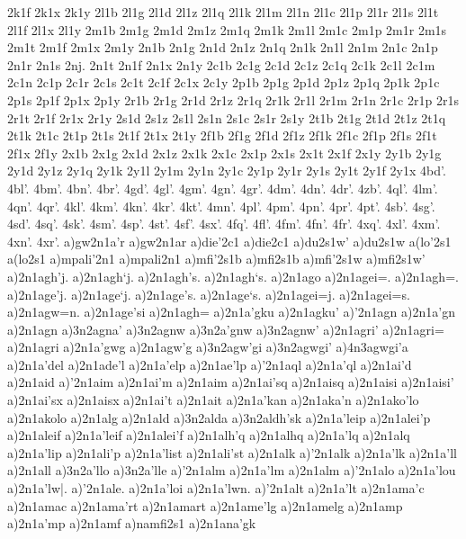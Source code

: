 {2k1f
2k1x
2k1y
%
2l1b
2l1g
2l1d
2l1z
2l1q
2l1k
2l1m
2l1n
2l1c
2l1p
2l1r
2l1s
2l1t
2l1f
2l1x
2l1y
%
2m1b
2m1g
2m1d
2m1z
2m1q
2m1k
2m1l
2m1c
2m1p
2m1r
2m1s
2m1t
2m1f
2m1x
2m1y
%
2n1b
2n1g
2n1d
2n1z
2n1q
2n1k
2n1l
2n1m
2n1c
2n1p
2n1r
2n1s
2nj.
2n1t
2n1f
2n1x
2n1y
%
2c1b
2c1g
2c1d
2c1z
2c1q
2c1k
2c1l
2c1m
2c1n
2c1p
2c1r
2c1s
2c1t
2c1f
2c1x
2c1y
%
2p1b
2p1g
2p1d
2p1z
2p1q
2p1k
2p1c
2p1s
2p1f
2p1x
2p1y
%
2r1b
2r1g
2r1d
2r1z
2r1q
2r1k
2r1l
2r1m
2r1n
2r1c
2r1p
2r1s
2r1t
2r1f
2r1x
2r1y
%
2s1d
2s1z
2s1l
2s1n
2s1c
2s1r
2s1y
%
2t1b
2t1g
2t1d
2t1z
2t1q
2t1k
2t1c
2t1p
2t1s
2t1f
2t1x
2t1y
%
2f1b
2f1g
2f1d
2f1z
2f1k
2f1c
2f1p
2f1s
2f1t
2f1x
2f1y
%
2x1b
2x1g
2x1d
2x1z
2x1k
2x1c
2x1p
2x1s
2x1t
2x1f
2x1y
%
2y1b
2y1g
2y1d
2y1z
2y1q
2y1k
2y1l
2y1m
2y1n
2y1c
2y1p
2y1r
2y1s
2y1t
2y1f
2y1x
4bd'.
4bl'.
4bm'.
4bn'.
4br'.
%
4gd'.
4gl'.
4gm'.
4gn'.
4gr'.
%
4dm'.
4dn'.
4dr'.
%
4zb'.
%
4ql'.
4lm'.
4qn'.
4qr'.
%
4kl'.
4km'.
4kn'.
4kr'.
4kt'.
%
4mn'.
%
4pl'.
4pm'.
4pn'.
4pr'.
4pt'.
%
4sb'.
4sg'.
4sd'.
4sq'.
4sk'.
4sm'.
4sp'.
4st'.
4sf'.
4sx'.
%
4fq'.
4fl'.
4fm'.
4fn'.
4fr'.
%
4xq'.
4xl'.
4xm'.
4xn'.
4xr'.
%
a)gw2n1a'r
a)gw2n1ar
a)die'2c1
a)die2c1
a)du2s1w'
a)du2s1w
a(lo'2s1
a(lo2s1
a)mpali'2n1
a)mpali2n1
a)mfi'2s1b
a)mfi2s1b
a)mfi'2s1w
a)mfi2s1w'
a)2n1agh'j.
a)2n1agh`j.
a)2n1agh's.
a)2n1agh`s.
a)2n1ago
a)2n1agei=.
a)2n1agh=.
a)2n1age'j.
a)2n1age`j.
a)2n1age's.
a)2n1age`s.
a)2n1agei=j.
a)2n1agei=s.
a)2n1agw=n.
a)2n1age'si
a)2n1agh=
a)2n1a'gku
a)2n1agku'
a)'2n1agn
a)2n1a'gn
a)2n1agn
a)3n2agna'
a)3n2agnw
a)3n2a'gnw
a)3n2agnw'
a)2n1agri'
a)2n1agri=
a)2n1agri
a)2n1a'gwg
a)2n1agw'g
a)3n2agw'gi
a)3n2agwgi'
a)4n3agwgi'a
a)2n1a'del
a)2n1ade'l
a)2n1a'elp
a)2n1ae'lp
a)'2n1aql
a)2n1a'ql
a)2n1ai'd
a)2n1aid
a)'2n1aim
a)2n1ai'm
a)2n1aim
a)2n1ai'sq
a)2n1aisq
a)2n1aisi
a)2n1aisi'
a)2n1ai'sx
a)2n1aisx
a)2n1ai't
a)2n1ait
a)2n1a'kan
a)2n1aka'n
a)2n1ako'lo
a)2n1akolo
a)2n1alg
a)2n1ald
a)3n2alda
a)3n2aldh'sk
a)2n1a'leip
a)2n1alei'p
a)2n1aleif
a)2n1a'leif
a)2n1alei'f
a)2n1alh'q
a)2n1alhq
a)2n1a'lq
a)2n1alq
a)2n1a'lip
a)2n1ali'p
a)2n1a'list
a)2n1ali'st
a)2n1alk
a)'2n1alk
a)2n1a'lk
a)2n1a'll
a)2n1all
a)3n2a'llo
a)3n2a'lle
a)'2n1alm
a)2n1a'lm
a)2n1alm
a)'2n1alo
a)2n1a'lou
a)2n1a'lw|.
a)'2n1ale.
a)2n1a'loi
a)2n1a'lwn.
a)'2n1alt
a)2n1a'lt
a)2n1ama'c
a)2n1amac
a)2n1ama'rt
a)2n1amart
a)2n1ame'lg
a)2n1amelg
a)2n1amp
a)2n1a'mp
a)2n1amf
a)namfi2s1
a)2n1ana'gk
}
